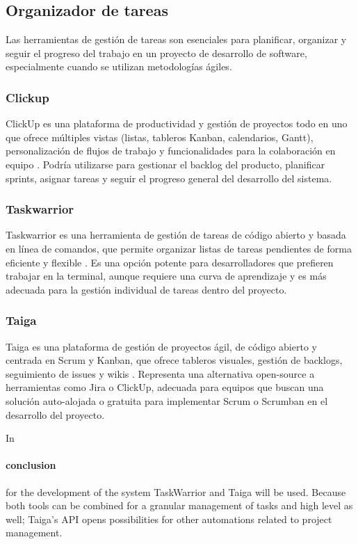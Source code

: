 \subsection{Organizador de tareas}
Las herramientas de gestión de tareas son esenciales para planificar, organizar y seguir el progreso del trabajo en un proyecto de desarrollo de software, especialmente cuando se utilizan metodologías ágiles.

\subsubsection{Clickup}
ClickUp es una plataforma de productividad y gestión de proyectos todo en uno que ofrece múltiples vistas (listas, tableros Kanban, calendarios, Gantt), personalización de flujos de trabajo y funcionalidades para la colaboración en equipo \parencite{ClickUp}.
Podría utilizarse para gestionar el backlog del producto, planificar sprints, asignar tareas y seguir el progreso general del desarrollo del sistema.

\subsubsection{Taskwarrior}
Taskwarrior es una herramienta de gestión de tareas de código abierto y basada en línea de comandos, que permite organizar listas de tareas pendientes de forma eficiente y flexible \parencite{Taskwarrior}.
Es una opción potente para desarrolladores que prefieren trabajar en la terminal, aunque requiere una curva de aprendizaje y es más adecuada para la gestión individual de tareas dentro del proyecto.

\subsubsection{Taiga}
Taiga es una plataforma de gestión de proyectos ágil, de código abierto y centrada en Scrum y Kanban, que ofrece tableros visuales, gestión de backlogs, seguimiento de issues y wikis \parencite{Taiga}.
Representa una alternativa open-source a herramientas como Jira o ClickUp, adecuada para equipos que buscan una solución auto-alojada o gratuita para implementar Scrum o Scrumban en el desarrollo del proyecto.

In \paragraph{conclusion} for the development of the system TaskWarrior and Taiga will be used.
Because both tools can be combined for a granular management of tasks and high level as well; Taiga's API opens possibilities for other automations related to project management.
